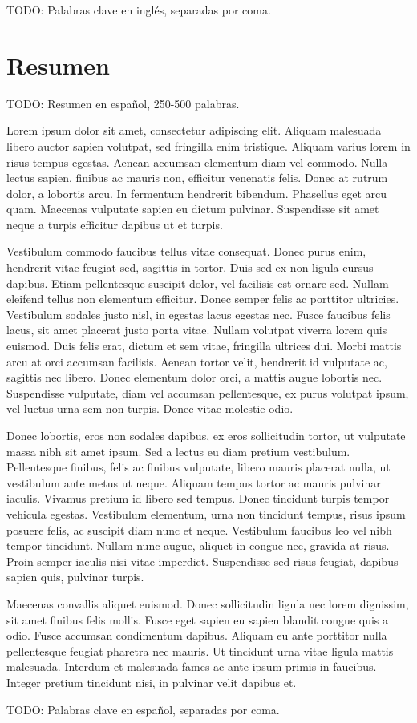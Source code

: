\begin{keywordsEn}
TODO: Palabras clave en inglés, separadas por coma.
\end{keywordsEn}

\chapter*{Resumen}

\begin{abstractEs}
TODO: Resumen en español, 250-500 palabras.

Lorem ipsum dolor sit amet, consectetur adipiscing elit. Aliquam malesuada libero auctor sapien volutpat, sed fringilla enim tristique. Aliquam varius lorem in risus tempus egestas. Aenean accumsan elementum diam vel commodo. Nulla lectus sapien, finibus ac mauris non, efficitur venenatis felis. Donec at rutrum dolor, a lobortis arcu. In fermentum hendrerit bibendum. Phasellus eget arcu quam. Maecenas vulputate sapien eu dictum pulvinar. Suspendisse sit amet neque a turpis efficitur dapibus ut et turpis.

Vestibulum commodo faucibus tellus vitae consequat. Donec purus enim, hendrerit vitae feugiat sed, sagittis in tortor. Duis sed ex non ligula cursus dapibus. Etiam pellentesque suscipit dolor, vel facilisis est ornare sed. Nullam eleifend tellus non elementum efficitur. Donec semper felis ac porttitor ultricies. Vestibulum sodales justo nisl, in egestas lacus egestas nec. Fusce faucibus felis lacus, sit amet placerat justo porta vitae. Nullam volutpat viverra lorem quis euismod. Duis felis erat, dictum et sem vitae, fringilla ultrices dui. Morbi mattis arcu at orci accumsan facilisis. Aenean tortor velit, hendrerit id vulputate ac, sagittis nec libero. Donec elementum dolor orci, a mattis augue lobortis nec. Suspendisse vulputate, diam vel accumsan pellentesque, ex purus volutpat ipsum, vel luctus urna sem non turpis. Donec vitae molestie odio.

Donec lobortis, eros non sodales dapibus, ex eros sollicitudin tortor, ut vulputate massa nibh sit amet ipsum. Sed a lectus eu diam pretium vestibulum. Pellentesque finibus, felis ac finibus vulputate, libero mauris placerat nulla, ut vestibulum ante metus ut neque. Aliquam tempus tortor ac mauris pulvinar iaculis. Vivamus pretium id libero sed tempus. Donec tincidunt turpis tempor vehicula egestas. Vestibulum elementum, urna non tincidunt tempus, risus ipsum posuere felis, ac suscipit diam nunc et neque. Vestibulum faucibus leo vel nibh tempor tincidunt. Nullam nunc augue, aliquet in congue nec, gravida at risus. Proin semper iaculis nisi vitae imperdiet. Suspendisse sed risus feugiat, dapibus sapien quis, pulvinar turpis.

Maecenas convallis aliquet euismod. Donec sollicitudin ligula nec lorem dignissim, sit amet finibus felis mollis. Fusce eget sapien eu sapien blandit congue quis a odio. Fusce accumsan condimentum dapibus. Aliquam eu ante porttitor nulla pellentesque feugiat pharetra nec mauris. Ut tincidunt urna vitae ligula mattis malesuada. Interdum et malesuada fames ac ante ipsum primis in faucibus. Integer pretium tincidunt nisi, in pulvinar velit dapibus et.
\end{abstractEs}

\begin{keywordsEs}
TODO: Palabras clave en español, separadas por coma.
\end{keywordsEs}